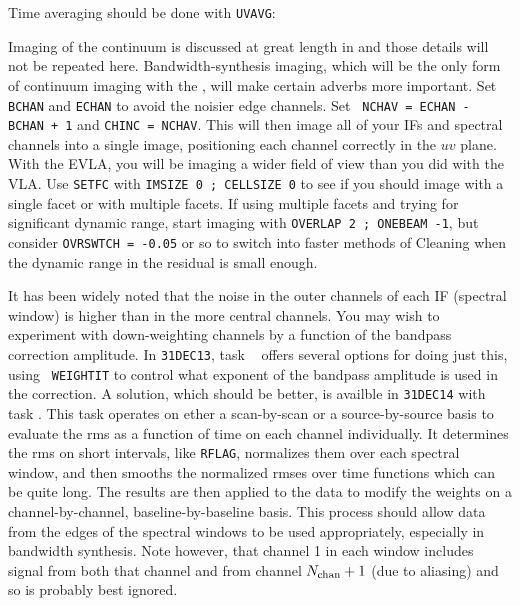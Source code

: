 Time averaging should be done with {\tt UVAVG}:

Imaging of the continuum is discussed at great length in 
and those details will not be repeated here.  Bandwidth-synthesis
imaging, which will be the only form of continuum imaging with the
, will make certain adverbs more important.  Set {\tt
BCHAN} and {\tt ECHAN} to avoid the noisier edge channels.  Set {\tt
NCHAV = ECHAN - BCHAN + 1} and {\tt CHINC = NCHAV}.  This will then
image all of your IFs and spectral channels into a single image,
positioning each channel correctly in the $uv$ plane.  With the EVLA,
you will be imaging a wider field of view than you did with the VLA\@.
Use {\tt SETFC} with {\tt IMSIZE 0 ; CELLSIZE 0} to see if you should
image with a single facet or with multiple facets.  If using multiple
facets and trying for significant dynamic range, start imaging with
{\tt OVERLAP 2 ; ONEBEAM -1}, but consider {\tt OVRSWTCH = -0.05} or
so to switch into faster methods of Cleaning when the dynamic range in
the residual is small enough.

It has been widely noted that the noise in the outer channels of each
IF (spectral window) is higher than in the more central channels.  You
may wish to experiment with down-weighting channels by a function of
the bandpass correction amplitude.  In {\tt 31DEC13}, task {\tt
{}} offers several options for doing just this, using {\tt
WEIGHTIT} to control what exponent of the bandpass amplitude is used
in the correction.  A solution, which should be better, is availble in
{\tt 31DEC14} with task {\tt {}}\@.  This task operates on
ether a scan-by-scan or a source-by-source basis to evaluate the rms
as a function of time on each channel individually.  It determines the
rms on short intervals, like {\tt RFLAG}, normalizes them over each
spectral window, and then smooths the normalized rmses over time
functions which can be quite long.  The results are then applied to
the data to modify the weights on a channel-by-channel,
baseline-by-baseline basis.  This process should allow data from the
edges of the spectral windows to be used appropriately, especially in
bandwidth synthesis.  Note however, that channel 1 in each window
includes signal from both that channel and from channel $N_{\rm chan}
+ 1$ (due to aliasing) and so is probably best ignored.

